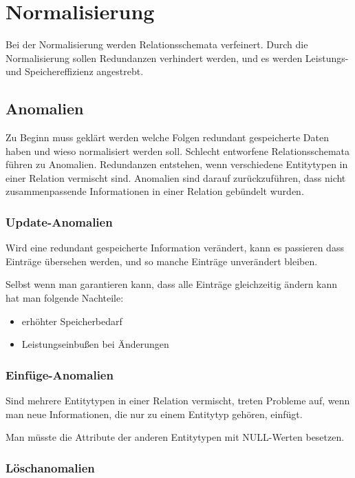 \chapter{Normalisierung}\label{cha:ormalisierung}

Bei der Normalisierung werden Relationsschemata verfeinert. Durch die Normalisierung sollen Redundanzen verhindert werden, und es werden Leistungs- und Speichereffizienz angestrebt.

\section{Anomalien}

Zu Beginn muss geklärt werden welche Folgen redundant gespeicherte Daten haben und wieso normalisiert werden soll.
Schlecht entworfene Relationsschemata führen zu Anomalien.
Redundanzen entstehen, wenn verschiedene Entitytypen in einer Relation vermischt sind.
Anomalien sind darauf zurückzuführen, dass nicht zusammenpassende Informationen in einer Relation gebündelt wurden.

\subsection{Update-Anomalien}

Wird eine redundant gespeicherte Information verändert, kann es passieren dass Einträge übersehen werden, und so manche Einträge unverändert bleiben.

Selbst wenn man garantieren kann, dass alle Einträge gleichzeitig ändern kann hat man folgende Nachteile:

\begin{itemize}
    \item erhöhter Speicherbedarf
    \item Leistungseinbußen bei Änderungen
\end{itemize}

\subsection{Einfüge-Anomalien}

Sind mehrere Entitytypen in einer Relation vermischt, treten Probleme auf, wenn man neue Informationen, die nur zu einem Entitytyp gehören, einfügt.

Man müsste die Attribute der anderen Entitytypen mit NULL-Werten besetzen.

\subsection{Löschanomalien}

